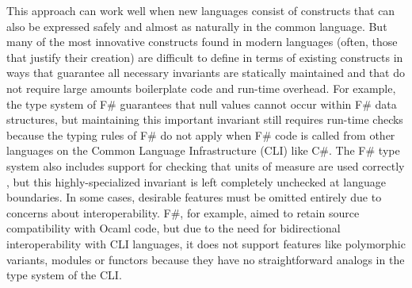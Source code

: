 This approach can work well when new languages consist of constructs that can also be expressed safely and almost as naturally in the common language.
But many of the most innovative constructs found in modern languages (often, those that justify their creation) are difficult to define in terms of existing constructs in ways that guarantee all necessary invariants are statically maintained and that do not require large amounts boilerplate code and run-time overhead. For example, the type system of F\# guarantees that null values cannot occur within F\# data structures, but maintaining this important invariant still requires run-time checks because the typing rules of F\# do not apply when F\# code is called from other languages on the Common Language Infrastructure (CLI) like C\#. The F\# type system also includes support for checking that units of measure are used correctly \cite{syme2012expert, kennedy1994dimension}, but this highly-specialized invariant is left completely unchecked at language boundaries. 
In some cases, desirable features must be omitted entirely due to concerns about interoperability. F\#, for example, aimed to retain source compatibility with Ocaml code, but due to the need for bidirectional interoperability with CLI languages, it does not support features like polymorphic variants, modules or functors \cite{ocaml-manual} because they have no straightforward analogs in the type system of the CLI.

